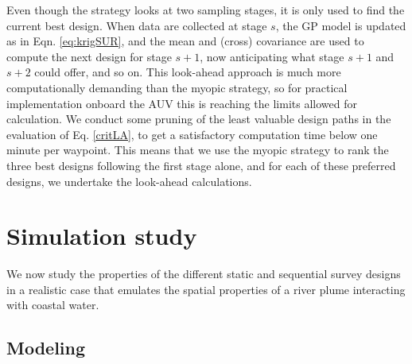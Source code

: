 \documentclass[aoas]{imsart}
\begin{document}
Even though the strategy looks at two sampling stages, it is only used to find
the current best design. When data are collected at stage $s$, the GP model is
updated as in Eqn. \eqref{eq:krigSUR}, and the mean and (cross) covariance are
used to compute the next design for stage $s+1$, now anticipating what
stage $s+1$ and $s+2$ could offer, and so on.
This look-ahead approach is much more computationally demanding than
the myopic strategy, so for practical implementation onboard the AUV this is reaching the limits allowed for calculation. We conduct some pruning of the least valuable design paths in the evaluation of Eq. \eqref{critLA}, to get a satisfactory computation time below one minute per waypoint. This means that we use the myopic
strategy to rank the three best designs following the first stage alone, and
for each of these preferred designs, we undertake the look-ahead calculations.

\section{Simulation study}
\label{sec:simulations}

We now study the properties of the different static and sequential
survey designs in a realistic case that emulates the spatial
properties of a river plume interacting with coastal water.

\subsection{Modeling}
\end{document}
